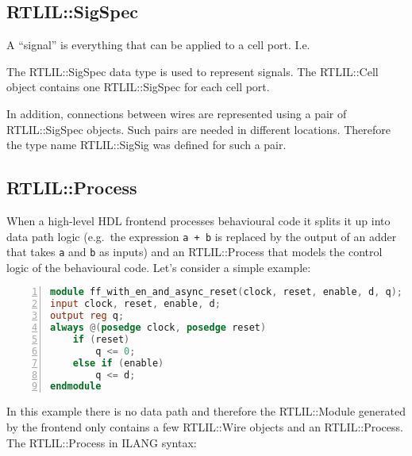 \subsection{RTLIL::SigSpec}

A ``signal'' is everything that can be applied to a cell port. I.e.


The RTLIL::SigSpec data type is used to represent signals. The RTLIL::Cell
object contains one RTLIL::SigSpec for each cell port.

In addition, connections between wires are represented using a pair of
RTLIL::SigSpec objects. Such pairs are needed in different locations. Therefore
the type name RTLIL::SigSig was defined for such a pair.

\subsection{RTLIL::Process}

When a high-level HDL frontend processes behavioural code it splits it up into
data path logic (e.g.~the expression {\tt a + b} is replaced by the output of an
adder that takes {\tt a} and {\tt b} as inputs) and an RTLIL::Process that models
the control logic of the behavioural code. Let's consider a simple example:

\begin{lstlisting}[numbers=left,frame=single,language=Verilog]
module ff_with_en_and_async_reset(clock, reset, enable, d, q);
input clock, reset, enable, d;
output reg q;
always @(posedge clock, posedge reset)
	if (reset)
		q <= 0;
	else if (enable)
		q <= d;
endmodule
\end{lstlisting}

In this example there is no data path and therefore the RTLIL::Module generated by
the frontend only contains a few RTLIL::Wire objects and an RTLIL::Process.
The RTLIL::Process in ILANG syntax:

